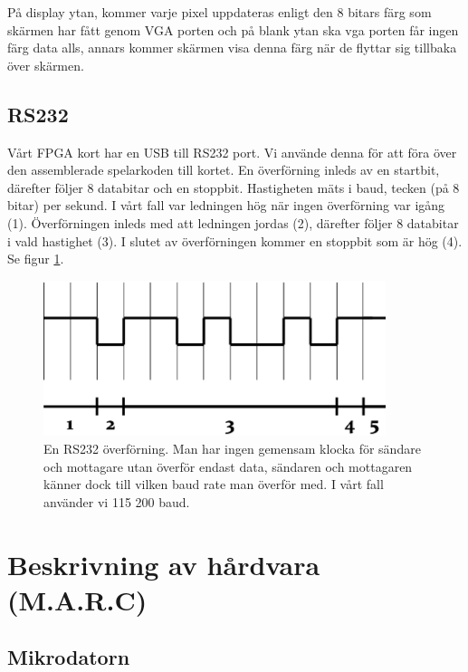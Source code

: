 \documentclass[11pt]{article}
\begin{document}
På display ytan, kommer varje pixel uppdateras enligt den 8 bitars färg som skärmen har fått genom VGA porten och på blank ytan ska vga porten får ingen färg data alls, annars kommer skärmen visa denna färg när de flyttar sig tillbaka över skärmen.

\subsection{RS232}

Vårt FPGA kort har en USB till RS232 port. Vi använde denna för att föra över den assemblerade spelarkoden till kortet. En överförning inleds av en startbit, därefter följer 8 databitar och en stoppbit. Hastigheten mäts i baud, tecken (på 8 bitar) per sekund. I vårt fall var ledningen hög när ingen överförning var igång (1). Överförningen inleds med att ledningen jordas (2), därefter följer 8 databitar i vald hastighet (3). I slutet av överförningen kommer en stoppbit som är hög (4). Se figur \ref{fig:rs232}.

\begin{figure}[h]
    \begin{center}
        \includegraphics[width=10cm]{rs232.eps}
        \caption{En RS232 överförning. Man har ingen gemensam klocka för sändare och mottagare utan överför endast data, sändaren och mottagaren känner dock till vilken baud rate man överför med. I vårt fall använder vi 115 200 baud.}
        \label{fig:rs232}
    \end{center}
\end{figure}

\newpage


\section{Beskrivning av hårdvara (M.A.R.C)}

\subsection{Mikrodatorn}
\end{document}
